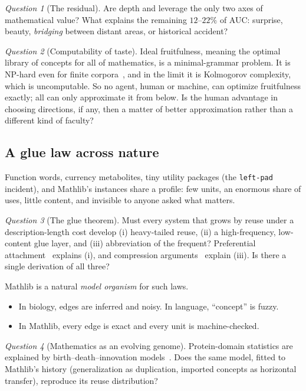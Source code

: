 \documentclass[11pt]{article}
\theoremstyle{remark}
\newtheorem{question}{Question}
\newcommand{\lean}[1]{\texttt{#1}}
\begin{document}
\begin{question}[The residual]
Are depth and leverage the only two axes of mathematical value? What explains the
remaining $12$--$22\%$ of AUC: surprise, beauty, \emph{bridging} between distant areas, or
historical accident?
\end{question}

\begin{question}[Computability of taste]
Ideal fruitfulness, meaning the optimal library of concepts for all of mathematics, is a
minimal-grammar problem. It is NP-hard even for finite corpora~\cite{charikar}, and in the
limit it is Kolmogorov complexity, which is uncomputable. So no agent, human or machine,
can optimize fruitfulness exactly; all can only approximate it from below. Is the human
advantage in choosing directions, if any, then a matter of better approximation rather than
a different kind of faculty?
\end{question}

\subsection{A glue law across nature}

Function words, currency metabolites, tiny utility packages (the \lean{left-pad} incident),
and Mathlib's instances share a profile: few units, an enormous share of uses, little
content, and invisible to anyone asked what matters.

\begin{question}[The glue theorem]
Must every system that grows by reuse under a description-length cost develop (i)
heavy-tailed reuse, (ii) a high-frequency, low-content glue layer, and (iii) abbreviation of
the frequent? Preferential attachment~\cite{price} explains (i), and compression
arguments~\cite{ferrer} explain (iii). Is there a single derivation of all three?
\end{question}

\noindent Mathlib is a natural \emph{model organism} for such laws.
\begin{itemize}
\item In biology, edges are inferred and noisy. In language, ``concept'' is fuzzy.
\item In Mathlib, every edge is exact and every unit is machine-checked.
\end{itemize}

\begin{question}[Mathematics as an evolving genome]
Protein-domain statistics are explained by birth--death--innovation models~\cite{koonin}.
Does the same model, fitted to Mathlib's history (generalization as duplication, imported
concepts as horizontal transfer), reproduce its reuse distribution?
\end{question}
\end{document}
